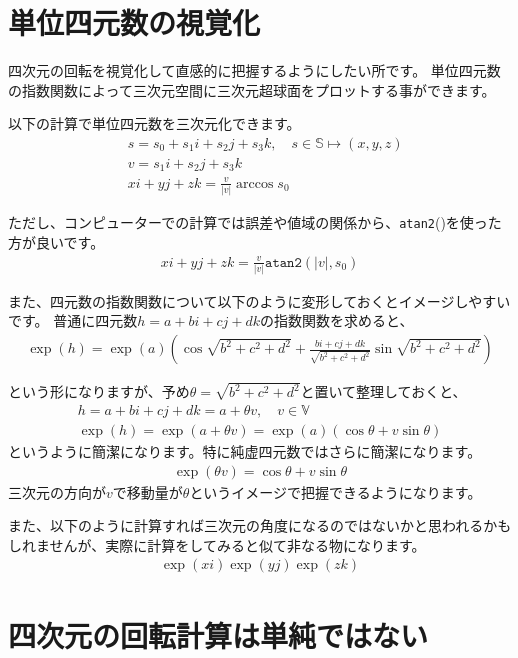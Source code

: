 \documentclass[a4paper,12pt,notitlepage]{jsreport}
\begin{document}
\section{単位四元数の視覚化}

四次元の回転を視覚化して直感的に把握するようにしたい所です。
単位四元数の指数関数によって三次元空間に三次元超球面をプロットする事ができます。

以下の計算で単位四元数を三次元化できます。
\begin{equation}
  \begin{split}
    &s=s_0+s_1i+s_2j+s_3k,\quad s\in\mathbb{S}\mapsto (x,y,z)\\
    &v=s_1i+s_2j+s_3k\\
    &xi+yj+zk=\frac{v}{|v|}\arccos s_0
  \end{split}
\end{equation}

ただし、コンピューターでの計算では誤差や値域の関係から、\texttt{atan2}()を使った方が良いです。
\begin{gather}
  xi+yj+zk=\frac{v}{|v|}\texttt{atan2}(|v|, s_0)
\end{gather}

また、四元数の指数関数について以下のように変形しておくとイメージしやすいです。
普通に四元数$h=a+bi+cj+dk$の指数関数を求めると、
\begin{gather}
  \exp(h)=\exp(a)\left(\cos\sqrt{b^2+c^2+d^2}+\frac{bi+cj+dk}{\sqrt{b^2+c^2+d^2}}\sin\sqrt{b^2+c^2+d^2}\right)
\end{gather}

という形になりますが、予め$\theta=\sqrt{b^2+c^2+d^2}$と置いて整理しておくと、
\begin{gather}
  h=a+bi+cj+dk=a+\theta v,\quad v\in\mathbb{V}\\
  \exp(h)=\exp(a+\theta v)=\exp(a)(\cos \theta+v\sin\theta)
\end{gather}
というように簡潔になります。特に純虚四元数ではさらに簡潔になります。
\begin{gather}
  \exp(\theta v)=\cos \theta+v\sin\theta
\end{gather}
三次元の方向が$v$で移動量が$\theta$というイメージで把握できるようになります。

また、以下のように計算すれば三次元の角度になるのではないかと思われるかもしれませんが、実際に計算をしてみると似て非なる物になります。
\begin{gather}
  \exp(xi)\exp(yj)\exp(zk)
\end{gather}

\section{四次元の回転計算は単純ではない}
\end{document}
